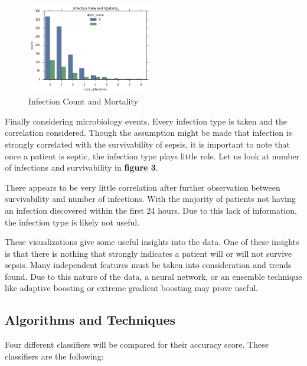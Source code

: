 \documentclass[11pt]{article}
\begin{document}
	\begin{figure}
		\begin{center}
			\includegraphics[width=0.48\textwidth]{bio_graph.png}
		\end{center}
		\caption{Infection Count and Mortality}
	\end{figure}
	
	Finally considering microbiology events. Every infection type is taken and the correlation considered. Though the assumption might be made that infection is strongly correlated with the survivability of sepsis, it is important to note that once a patient is septic, the infection type plays little role. Let us look at number of infections and survivability in \textbf{figure 3}.
	
	There appears to be very little correlation after further observation between survivability and number of infections. With the majority of patients not having an infection discovered within the first 24 hours. Due to this lack of information, the infection type is likely not useful. 
	
	These visualizations give some useful insights into the data. One of these insights is that there is nothing that strongly indicates a patient will or will not survive sepsis. Many independent features must be taken into consideration and trends found. Due to this nature of the data, a neural network, or an ensemble technique like adaptive boosting or extreme gradient boosting may prove useful. 
	
	
	
	\subsection{Algorithms and Techniques}
	Four different classifiers will be compared for their accuracy score. These classifiers are the following:
	
\end{document}
